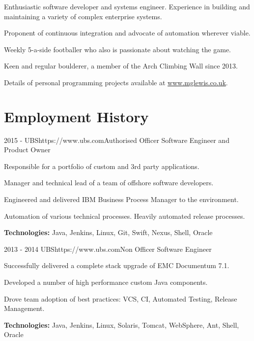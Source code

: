 \documentclass[10pt]{article}
\begin{document}
{\begin{itemize-noindent}
\setlength\itemsep{-0.2em}
\item Enthusiastic software developer and systems engineer. Experience in building and maintaining a variety of complex enterprise systems.
\item Proponent of continuous integration and advocate of automation wherever viable.
\item Weekly 5-a-side footballer who also is passionate about watching the game.
\item Keen and regular boulderer, a member of the Arch Climbing Wall since 2013. 
\item Details of personal programming projects available at \href{http://www.mglewis.co.uk}{www.mglewis.co.uk}.
\end{itemize-noindent}


\section{Employment History}

\job
{2015 -}
{UBS}{https://www.ubs.com}{Authorised Officer}
{Software Engineer and Product Owner}
{\begin{itemize-noindent}
\setlength\itemsep{-0.2em}
\item Responsible for a portfolio of custom and 3rd party applications.
\item Manager and technical lead of a team of offshore software developers.
\item Engineered and delivered IBM Business Process Manager to the environment.
\item Automation of various technical processes. Heavily automated release processes.
\end{itemize-noindent}
\textbf{Technologies:} Java, Jenkins, Linux, Git, Swift, Nexus, Shell, Oracle}

\job
{2013 - 2014}
{UBS}{https://www.ubs.com}{Non Officer}
{Software Engineer}
{\begin{itemize-noindent}
\setlength\itemsep{-0.2em}
\item Successfully delivered a complete stack upgrade of EMC Documentum 7.1.
\item Developed a number of high performance custom Java components.
\item Drove team adoption of best practices: VCS, CI, Automated Testing, Release Management.
\end{itemize-noindent}
\textbf{Technologies:} Java, Jenkins, Linux, Solaris, Tomcat, WebSphere, Ant, Shell, Oracle}

}
\end{document}
